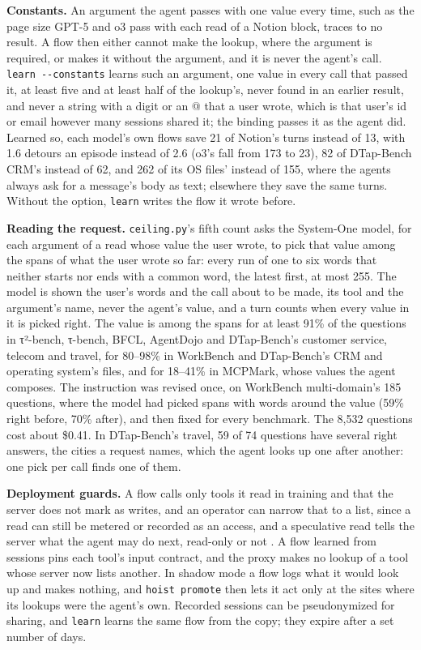 \documentclass[10pt,twocolumn,letterpaper]{article}
\newcommand{\runin}[1]{{\sffamily\bfseries\color{accent}#1}}
\begin{document}
\runin{Constants.} An argument the agent passes with one value every time, such as the page size GPT-5 and o3 pass with each read of a Notion block, traces to no result. A flow then either cannot make the lookup, where the argument is required, or makes it without the argument, and it is never the agent's call. \texttt{learn\ -\/-constants} learns such an argument, one value in every call that passed it, at least five and at least half of the lookup's, never found in an earlier result, and never a string with a digit or an @ that a user wrote, which is that user's id or email however many sessions shared it; the binding passes it as the agent did. Learned so, each model's own flows save 21 of Notion's turns instead of 13, with 1.6 detours an episode instead of 2.6 (o3's fall from 173 to 23), 82 of DTap-Bench CRM's instead of 62, and 262 of its OS files' instead of 155, where the agents always ask for a message's body as text; elsewhere they save the same turns. Without the option, \texttt{learn} writes the flow it wrote before.

\runin{Reading the request.} \texttt{ceiling.py}'s fifth count asks the System-One model, for each argument of a read whose value the user wrote, to pick that value among the spans of what the user wrote so far: every run of one to six words that neither starts nor ends with a common word, the latest first, at most 255. The model is shown the user's words and the call about to be made, its tool and the argument's name, never the agent's value, and a turn counts when every value in it is picked right. The value is among the spans for at least 91\% of the questions in τ²-bench, τ-bench, BFCL, AgentDojo and DTap-Bench's customer service, telecom and travel, for 80--98\% in WorkBench and DTap-Bench's CRM and operating system's files, and for 18--41\% in MCPMark, whose values the agent composes. The instruction was revised once, on WorkBench multi-domain's 185 questions, where the model had picked spans with words around the value (59\% right before, 70\% after), and then fixed for every benchmark. The 8,532 questions cost about \$0.41. In DTap-Bench's travel, 59 of 74 questions have several right answers, the cities a request names, which the agent looks up one after another: one pick per call finds one of them.

\runin{Deployment guards.} A flow calls only tools it read in training and that the server does not mark as writes, and an operator can narrow that to a list, since a read can still be metered or recorded as an access, and a speculative read tells the server what the agent may do next, read-only or not \citep{mohammadi2026ghost}. A flow learned from sessions pins each tool's input contract, and the proxy makes no lookup of a tool whose server now lists another. In shadow mode a flow logs what it would look up and makes nothing, and \texttt{hoist\ promote} then lets it act only at the sites where its lookups were the agent's own. Recorded sessions can be pseudonymized for sharing, and \texttt{learn} learns the same flow from the copy; they expire after a set number of days.
\end{document}
